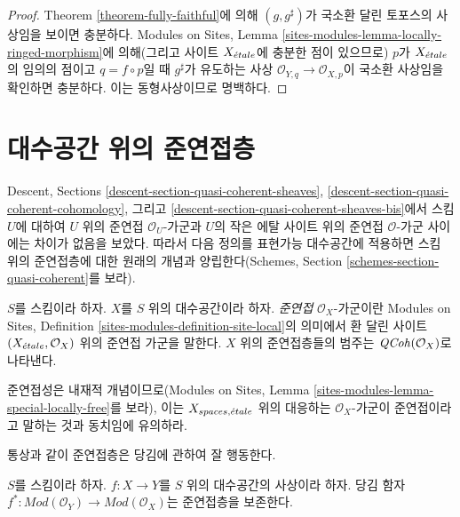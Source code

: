 \begin{proof}
Theorem \ref{theorem-fully-faithful}에 의해 $(g, g^\sharp)$가 국소환
달린 토포스의 사상임을 보이면 충분하다. Modules on Sites, Lemma
\ref{sites-modules-lemma-locally-ringed-morphism}에 의해(그리고 사이트
$X_{\acute{e}tale}$에 충분한 점이 있으므로) $p$가 $X_{\acute{e}tale}$의 임의의 점이고
$q = f \circ p$일 때 $g^\sharp$가 유도하는 사상
$\mathcal{O}_{Y, q} \to \mathcal{O}_{X, p}$이 국소환 사상임을 확인하면
충분하다. 이는 동형사상이므로 명백하다.
\end{proof}


\section{대수공간 위의 준연접층}
\label{section-quasi-coherent}

\noindent
Descent, Sections \ref{descent-section-quasi-coherent-sheaves},
\ref{descent-section-quasi-coherent-cohomology}, 그리고
\ref{descent-section-quasi-coherent-sheaves-bis}에서 스킴 $U$에 대하여
$U$ 위의 준연접 $\mathcal{O}_U$-가군과 $U$의 작은 에탈 사이트 위의
준연접 $\mathcal{O}$-가군 사이에는 차이가 없음을 보았다. 따라서 다음
정의를 표현가능 대수공간에 적용하면 스킴 위의 준연접층에 대한 원래의
개념과 양립한다(Schemes, Section
\ref{schemes-section-quasi-coherent}를 보라).

\begin{definition}
\label{definition-quasi-coherent}
$S$를 스킴이라 하자. $X$를 $S$ 위의 대수공간이라 하자.
{\it 준연접} $\mathcal{O}_X$-가군이란 Modules on Sites, Definition
\ref{sites-modules-definition-site-local}의 의미에서 환 달린 사이트
$(X_{\acute{e}tale}, \mathcal{O}_X)$ 위의 준연접 가군을 말한다.
$X$ 위의 준연접층들의 범주는 $\mathit{QCoh}(\mathcal{O}_X)$로 나타낸다.
\end{definition}

\noindent
준연접성은 내재적 개념이므로(Modules on Sites, Lemma
\ref{sites-modules-lemma-special-locally-free}를 보라), 이는
$X_{spaces, {\acute{e}tale}}$ 위의 대응하는 $\mathcal{O}_X$-가군이 준연접이라고
말하는 것과 동치임에 유의하라.

\medskip\noindent
통상과 같이 준연접층은 당김에 관하여 잘 행동한다.

\begin{lemma}
\label{lemma-pullback-quasi-coherent}
$S$를 스킴이라 하자.
$f : X \to Y$를 $S$ 위의 대수공간의 사상이라 하자.
당김 함자
$f^* : \textit{Mod}(\mathcal{O}_Y) \to \textit{Mod}(\mathcal{O}_X)$는
준연접층을 보존한다.
\end{lemma}

